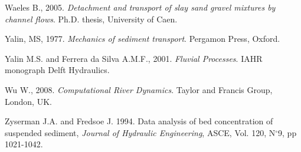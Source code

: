 \begin{thebibliography}{25}
Waeles B., 2005. \emph{Detachment and transport of slay sand gravel
mixtures by channel flows}. Ph.D. thesis, University of Caen.

Yalin, MS, 1977. \emph{Mechanics of sediment transport}. Pergamon
Press, Oxford.

Yalin M.S. and Ferrera da Silva A.M.F., 2001. \emph{Fluvial
Processes}. IAHR monograph Delft Hydraulics.

Wu W., 2008. \emph{Computational River Dynamics}. Taylor and Francis Group, London, UK.

Zyserman J.A. and Fredsoe J. 1994. Data analysis of bed concentration of
suspended sediment, \emph{Journal of Hydraulic Engineering}, ASCE, Vol. 120, N$%
^\circ$9, pp 1021-1042.

\end{thebibliography}




